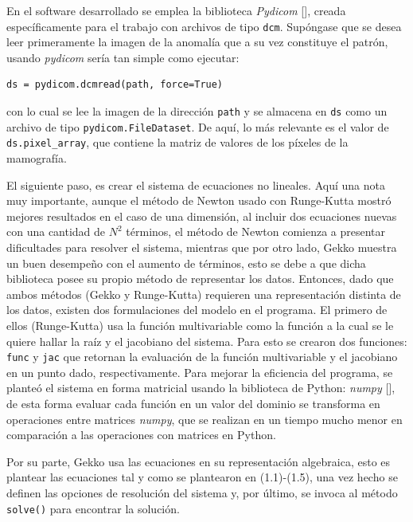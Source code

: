 \par En el software desarrollado se emplea la biblioteca \textit{Pydicom} [\cite{15}], creada espec\'ificamente para el trabajo con archivos de tipo \texttt{dcm}. Sup\'ongase que se desea leer primeramente la imagen de la anomal\'ia que a su vez constituye el patr\'on, usando \textit{pydicom} ser\'ia tan simple como ejecutar:\\
\begin{lstlisting}[caption=Leer una imagen .dcm., label=pydicom-read]
ds = pydicom.dcmread(path, force=True)
\end{lstlisting}
con lo cual se lee la imagen de la direcci\'on \texttt{path} y se almacena en \texttt{ds} como un archivo de tipo \texttt{pydicom.FileDataset}. De aqu\'i, lo m\'as relevante es el valor de \texttt{ds.pixel\_array}, que contiene la matriz de valores de los p\'ixeles de la mamograf\'ia.\\

\par El siguiente paso, es crear el sistema de ecuaciones no lineales. Aqu\'i una nota muy importante, aunque el m\'etodo de Newton usado con Runge-Kutta mostr\'o mejores resultados en el caso de una dimensi\'on, al incluir dos ecuaciones nuevas con una cantidad de $N^2$ t\'erminos, el m\'etodo de Newton comienza a presentar dificultades para resolver el sistema, mientras que por otro lado, Gekko muestra un buen desempe\~no con el aumento de t\'erminos, esto se debe a que dicha biblioteca posee su propio m\'etodo de representar los datos. Entonces, dado que ambos m\'etodos (Gekko y Runge-Kutta) requieren una representaci\'on distinta de los datos, existen dos formulaciones del modelo en el programa. El primero de ellos (Runge-Kutta) usa la funci\'on multivariable como la funci\'on a la cual se le quiere hallar la ra\'iz y el jacobiano del sistema. Para esto se crearon dos funciones: \texttt{func} y \texttt{jac} que retornan la evaluaci\'on de la funci\'on multivariable y el jacobiano en un punto dado, respectivamente. Para mejorar la eficiencia del programa, se plante\'o el sistema en forma matricial usando la biblioteca de Python: \textit{numpy} [\cite{14}], de esta forma evaluar cada funci\'on en un valor del dominio se transforma en operaciones entre matrices \textit{numpy}, que se realizan en un tiempo mucho menor en comparaci\'on a las operaciones con matrices en Python.
\par Por su parte, Gekko usa las ecuaciones en su representaci\'on algebraica, esto es plantear las ecuaciones tal y como se plantearon en (1.1)-(1.5), una vez hecho se definen las opciones de resoluci\'on del sistema y, por \'ultimo, se invoca al m\'etodo \texttt{solve()} para encontrar la soluci\'on.\\

